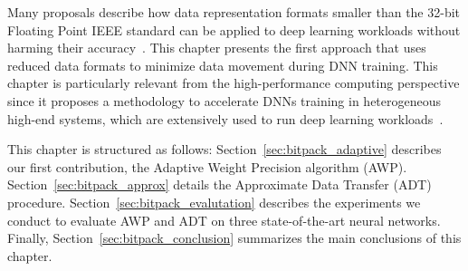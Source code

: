 Many proposals describe how data representation formats smaller than the 32-bit Floating Point IEEE standard can be applied to deep learning workloads without harming their accuracy~\cite{bottou08, gupta15, Micikevicius2018}.
This chapter presents the first approach that uses reduced data formats to minimize data movement during DNN training.
This chapter is particularly relevant from the high-performance computing perspective since it proposes
a methodology to accelerate DNNs training in heterogeneous high-end systems, which are extensively used to run deep learning workloads~\cite{You17}. 

This chapter is structured as follows:
Section~\ref{sec:bitpack_adaptive} describes our first contribution, the Adaptive Weight 
Precision algorithm (AWP). 
Section~\ref{sec:bitpack_approx} details the Approximate Data Transfer (ADT) procedure. 
Section~\ref{sec:bitpack_evalutation} describes the  
experiments we conduct to evaluate AWP and ADT on three state-of-the-art neural networks. 
Finally, Section~\ref{sec:bitpack_conclusion} summarizes the main conclusions of this chapter.
